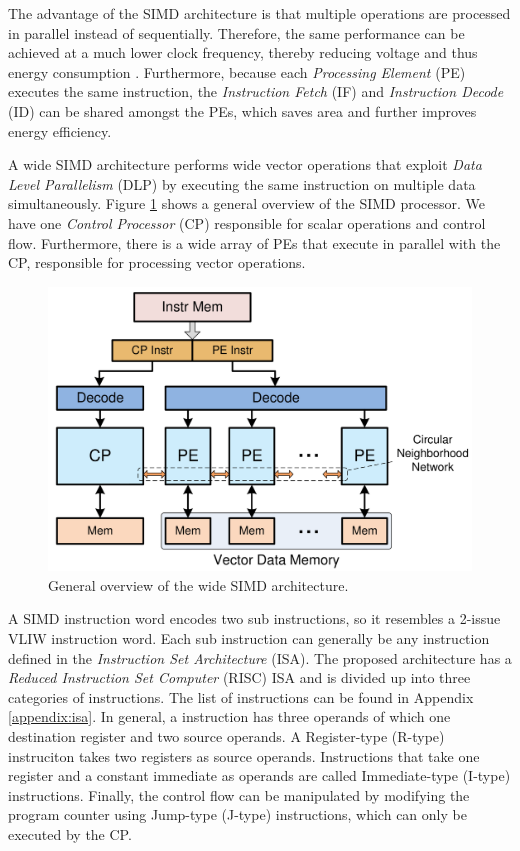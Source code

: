 
The advantage of the SIMD architecture is that multiple operations are processed in parallel instead of sequentially. Therefore, the same performance can be achieved at a much lower clock frequency, thereby reducing voltage and thus energy consumption \cite{dongrio1}. Furthermore, because each \emph{Processing Element} (PE) executes the same instruction, the \emph{Instruction Fetch} (IF) and \emph{Instruction Decode} (ID) can be shared amongst the PEs, which saves area and further improves energy efficiency.

A wide SIMD architecture \cite{simd} performs wide vector operations that exploit \emph{Data Level Parallelism} (DLP) by executing the same instruction on multiple data simultaneously. Figure \ref{fig:simd_overview} shows a general overview of the SIMD processor.
We have one \emph{Control Processor} (CP) responsible for scalar operations and control flow. Furthermore, there is a wide array of PEs that execute in parallel with the CP, responsible for processing vector operations.

\begin{figure}[H]
\centering
\includegraphics[width=.6\textwidth]{figures/simd_overview}
\caption{General overview of the wide SIMD architecture.}
\label{fig:simd_overview}
\end{figure}
A SIMD instruction word encodes two sub instructions, so it resembles a 2-issue VLIW instruction word. Each sub instruction can generally be any instruction defined in the \emph{Instruction Set Architecture} (ISA). The proposed architecture has a \emph{Reduced Instruction Set Computer} (RISC) ISA and is divided up into three categories of instructions. The list of instructions can be found in Appendix \ref{appendix:isa}. In general, a instruction has three operands of which one destination register and two source operands. A Register-type (R-type) instruciton takes two registers as source operands. Instructions that take one register and a constant immediate as operands are called Immediate-type (I-type) instructions. Finally, the control flow can be manipulated by modifying the program counter using Jump-type (J-type) instructions, which can only be executed by the CP.
\\

